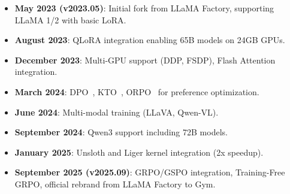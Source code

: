 \begin{itemize}
\item \textbf{May 2023 (v2023.05)}: Initial fork from LLaMA Factory, supporting LLaMA 1/2 with basic LoRA.
\item \textbf{August 2023}: QLoRA integration enabling 65B models on 24GB GPUs.
\item \textbf{December 2023}: Multi-GPU support (DDP, FSDP), Flash Attention integration.
\item \textbf{March 2024}: DPO~\citep{rafailov2023dpo}, KTO~\citep{ethayarajh2024kto}, ORPO~\citep{hong2024orpo} for preference optimization.
\item \textbf{June 2024}: Multi-modal training (LLaVA, Qwen-VL).
\item \textbf{September 2024}: Qwen3 support including 72B models.
\item \textbf{January 2025}: Unsloth and Liger kernel integration (2x speedup).
\item \textbf{September 2025 (v2025.09)}: GRPO/GSPO integration, Training-Free GRPO, official rebrand from LLaMA Factory to Gym.
\end{itemize}

